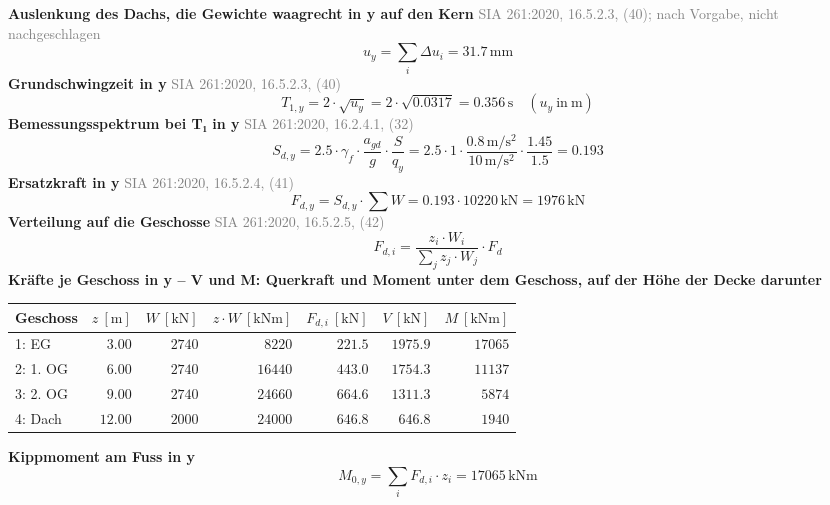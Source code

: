 \documentclass[11pt,a4paper]{article}
\newcommand{\normref}[1]{{\small\textcolor{gray}{#1}}}
\begin{document}
\noindent\textbf{Auslenkung des Dachs, die Gewichte waagrecht in y auf den Kern} \hfill \normref{SIA 261:2020, 16.5.2.3, (40); nach Vorgabe, nicht nachgeschlagen}
\begin{equation*}
u_y = \sum_i \Delta u_i = 31.7\,\mathrm{mm}
\end{equation*}
\noindent\textbf{Grundschwingzeit in y} \hfill \normref{SIA 261:2020, 16.5.2.3, (40)}
\begin{equation*}
T_{1,y} = 2 \cdot \sqrt{u_y} = 2 \cdot \sqrt{0.0317} = 0.356\,\mathrm{s} \quad \left(u_y\ \text{in}\ \mathrm{m}\right)
\end{equation*}
\noindent\textbf{Bemessungsspektrum bei T₁ in y} \hfill \normref{SIA 261:2020, 16.2.4.1, (32)}
\begin{equation*}
S_{d,y} = 2.5 \cdot \gamma_f \cdot \frac{a_{gd}}{g} \cdot \frac{S}{q_y} = 2.5 \cdot 1 \cdot \frac{0.8\,\mathrm{m}/\mathrm{s}^{2}}{10\,\mathrm{m}/\mathrm{s}^{2}} \cdot \frac{1.45}{1.5} = 0.193
\end{equation*}
\noindent\textbf{Ersatzkraft in y} \hfill \normref{SIA 261:2020, 16.5.2.4, (41)}
\begin{equation*}
F_{d,y} = S_{d,y} \cdot \sum W = 0.193 \cdot 10220\,\mathrm{kN} = 1976\,\mathrm{kN}
\end{equation*}
\noindent\textbf{Verteilung auf die Geschosse} \hfill \normref{SIA 261:2020, 16.5.2.5, (42)}
\begin{equation*}
F_{d,i} = \frac{z_i \cdot W_i}{\sum_j z_j \cdot W_j} \cdot F_d
\end{equation*}
\noindent\textbf{Kräfte je Geschoss in y – V und M: Querkraft und Moment unter dem Geschoss, auf der Höhe der Decke darunter}
\begin{longtable}{lrrrrrr}
\hline
Geschoss & $z\ [\mathrm{m}]$ & $W\ [\mathrm{kN}]$ & $z \cdot W\ [\mathrm{kNm}]$ & $F_{d,i}\ [\mathrm{kN}]$ & $V\ [\mathrm{kN}]$ & $M\ [\mathrm{kNm}]$ \\
\hline
\endhead
1: EG & $3.00$ & $2740$ & $8220$ & $221.5$ & $1975.9$ & $17065$ \\
2: 1. OG & $6.00$ & $2740$ & $16440$ & $443.0$ & $1754.3$ & $11137$ \\
3: 2. OG & $9.00$ & $2740$ & $24660$ & $664.6$ & $1311.3$ & $5874$ \\
4: Dach & $12.00$ & $2000$ & $24000$ & $646.8$ & $646.8$ & $1940$ \\
\hline
\end{longtable}
\noindent\textbf{Kippmoment am Fuss in y}
\begin{equation*}
M_{0,y} = \sum_i F_{d,i} \cdot z_i = 17065\,\mathrm{kNm}
\end{equation*}
\end{document}
